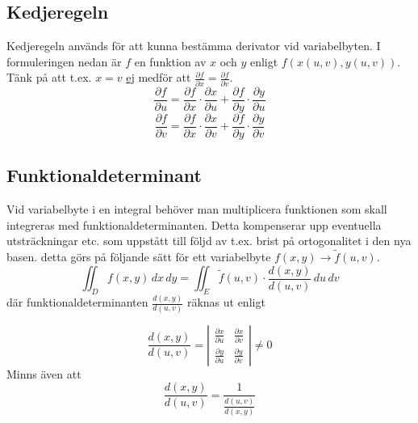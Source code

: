 \documentclass[10pt,a4paper]{article}
\begin{document}
\subsection{Kedjeregeln}
Kedjeregeln används för att kunna bestämma derivator vid variabelbyten. I formuleringen nedan är $f$ en funktion av $x$ och $y$ enligt $f(x(u,v),y(u,v))$. Tänk på att t.ex. $x=v$ \underline{ej} medför att $\frac{\partial f}{\partial x} = \frac{\partial f}{\partial v}$.
\begin{equation}
\frac{\partial f}{\partial u}=\frac{\partial f}{\partial x}\cdot \frac{\partial x}{\partial u} + \frac{\partial f}{\partial y} \cdot \frac{\partial y}{\partial u}
\end{equation}
\begin{equation}
\frac{\partial f}{\partial v}=\frac{\partial f}{\partial x}\cdot \frac{\partial x}{\partial v} + \frac{\partial f}{\partial y} \cdot \frac{\partial y}{\partial v}
\end{equation}

\subsection{Funktionaldeterminant}
Vid variabelbyte i en integral behöver man multiplicera funktionen som skall integreras med funktionaldeterminanten. Detta kompenserar upp eventuella utsträckningar etc. som uppstått till följd av t.ex. brist på ortogonalitet i den nya basen. detta görs på följande sätt för ett variabelbyte $f(x,y) \rightarrow \tilde{f}(u,v)$.
\begin{equation}
\iint_D f(x,y)\,dx\,dy = \iint_E \tilde{f}(u,v)\cdot \frac{d(x,y)}{d(u,v)}\,du\,dv
\end{equation}
där funktionaldeterminanten $\frac{d(x,y)}{d(u,v)}$ räknas ut enligt

\begin{equation}
\frac{d(x,y)}{d(u,v)} = \left| \begin{array}{ccc}\frac{\partial x}{\partial u} & \frac{\partial x}{\partial v} \\ \frac{\partial y}{\partial u} & \frac{\partial y}{\partial v} \end{array} \right| \neq 0
\end{equation}
Minns även att 
\begin{equation}
\frac{d(x,y)}{d(u,v)} = \frac{1}{\frac{d(u,v)}{d(x,y)}}
\end{equation}
\end{document}
